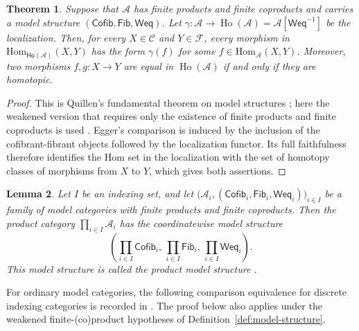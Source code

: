 \documentclass[10pt,a4paper]{amsart}
\theoremstyle{plain}
\newtheorem{theorem}{Theorem}[section]
\newtheorem{lemma}[theorem]{Lemma}
\theoremstyle{definition}
\theoremstyle{remark}
\begin{document}
\begin{theorem}\label{thm:quillen-homotopy-category}
  Suppose that $\mathcal A$ has finite products and finite coproducts and carries a model structure $(\mathsf{Cofib},\mathsf{Fib},\mathsf{Weq})$.
  Let $\gamma:\mathcal A\longrightarrow \operatorname{Ho}(\mathcal A) =\mathcal A[\mathsf{Weq}^{-1}]$ be the localization.
  Then, for every $X \in \mathcal{C}$ and $Y \in \mathcal{F}$, every morphism in $\mathrm{Hom}_{\mathsf{Ho}(\mathcal{A})}(X,Y)$ has the form $\gamma (f)$ for some $f \in \mathrm{Hom}_\mathcal{A}(X,Y)$.
  Moreover, two morphisms $f,g:X\longrightarrow Y$ are equal in $\operatorname{Ho}(\mathcal A)$ if and only if they are homotopic.
\end{theorem}

\begin{proof}
  This is Quillen's fundamental theorem on model structures \cite[Chapter~I, \S~1, Theorem~1 and Corollary~1, pp.~24--27]{Quillen}; here the weakened version that requires only the existence of finite products and finite coproducts is used \cite[Theorem~3.2]{EggerModelCategories}.
  Egger's comparison is induced by the inclusion of the cofibrant-fibrant objects followed by the localization functor.
  Its full faithfulness therefore identifies the Hom set in the localization with the set of homotopy classes of morphisms from $X$ to $Y$, which gives both assertions.
\end{proof}

\begin{lemma}\label{lem:product-model-structure}
  Let $I$ be an indexing set, and let $\bigl(\mathcal A_i,(\mathsf{Cofib}_i,\mathsf{Fib}_i,\mathsf{Weq}_i)\bigr)_{i\in I}$ be a family of model categories with finite products and finite coproducts.
  Then the product category $\prod_{i\in I}\mathcal A_i$ has the coordinatewise model structure
  \[
    \left(\prod_{i\in I}\mathsf{Cofib}_i,\,
    \prod_{i\in I}\mathsf{Fib}_i,\,
    \prod_{i\in I}\mathsf{Weq}_i\right).
  \]
  This model structure is called the product model structure \cite[Example~1.1.6, p.~4]{HoveyModelCategories}.
\end{lemma}

For ordinary model categories, the following comparison equivalence for discrete indexing categories is recorded in \cite[Section~2.5, equation~(2.7) and footnote~14, pp.~41--42]{RiehlHomotopicalCategories}.
The proof below also applies under the weakened finite-(co)product hypotheses of Definition~\ref{def:model-structure}.
\end{document}
